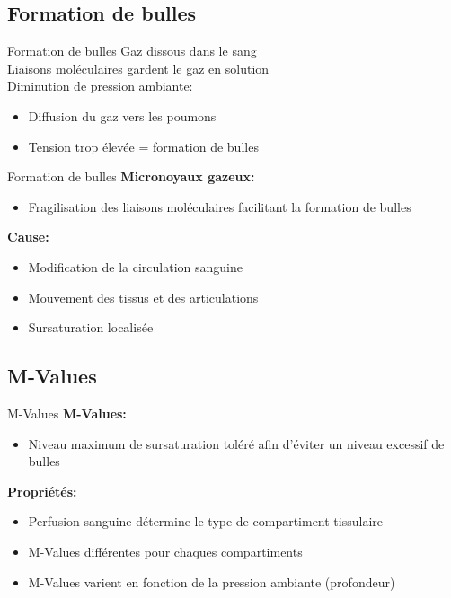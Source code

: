 \subsection{Formation de bulles}

\begin{frame}{Formation de bulles}  
	Gaz dissous dans le sang\\
	Liaisons moléculaires gardent le gaz en solution\\
	Diminution de pression ambiante:
	\begin{itemize}
		\item Diffusion du gaz vers les poumons
		\item Tension trop élevée = formation de bulles
	\end{itemize}
\end{frame}

\begin{frame}{Formation de bulles}
	\textbf{Micronoyaux gazeux:}
	\begin{itemize}
		\item Fragilisation des liaisons moléculaires facilitant la formation de bulles
	\end{itemize}
	\vfill
	\textbf{Cause:}
	\begin{itemize}
		\item Modification de la circulation sanguine
		\item Mouvement des tissus et des articulations
		\item Sursaturation localisée
	\end{itemize}
\end{frame}

\subsection{M-Values}

\begin{frame}{M-Values}  
	\textbf{M-Values:}
	\begin{itemize}
		\item Niveau maximum de sursaturation toléré afin d'éviter un niveau excessif de bulles
	\end{itemize}
	\vfill
	\textbf{Propriétés:}
	\begin{itemize}
		\item Perfusion sanguine détermine le type de compartiment tissulaire
		\item M-Values différentes pour chaques compartiments
		\item M-Values varient en fonction de la pression ambiante (profondeur)
	\end{itemize}
\end{frame}

